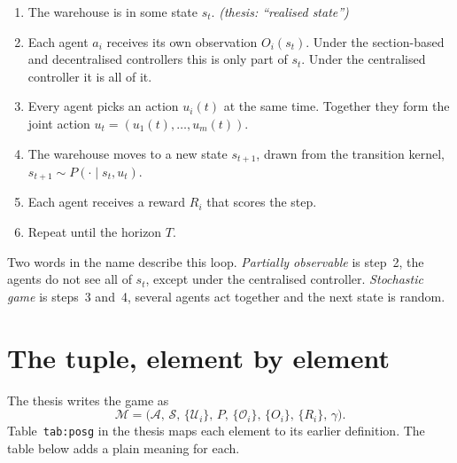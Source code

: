 \documentclass[11pt,a4paper]{article}
\newcommand{\where}[1]{\textit{\small (thesis: #1)}}
\begin{document}
\begin{enumerate}[label=\arabic*.,leftmargin=*]
  \item The warehouse is in some state $s_t$. \where{``realised state''}
  \item Each agent $a_i$ receives its own observation $O_i(s_t)$. Under
        the section-based and decentralised controllers this is only part
        of $s_t$. Under the centralised controller it is all of it.
  \item Every agent picks an action $u_i(t)$ at the same time. Together
        they form the joint action $u_t = (u_1(t),\dots,u_m(t))$.
  \item The warehouse moves to a new state $s_{t+1}$, drawn from the
        transition kernel, $s_{t+1} \sim P(\cdot \mid s_t, u_t)$.
  \item Each agent receives a reward $R_i$ that scores the step.
  \item Repeat until the horizon $T$.
\end{enumerate}

\noindent Two words in the name describe this loop.
\emph{Partially observable} is step~2, the agents do not see all of $s_t$,
except under the centralised controller. \emph{Stochastic game} is
steps~3 and~4, several agents act together and the next state is random.

\section{The tuple, element by element}
\label{sec:guide-tuple}

The thesis writes the game as
\[
  \mathcal{M} = \bigl( \mathcal{A},\, \mathcal{S},\, \{\mathcal{U}_i\},\,
                       P,\, \{\mathcal{O}_i\},\, \{O_i\},\,
                       \{R_i\},\, \gamma \bigr).
\]
Table~\texttt{tab:posg} in the thesis maps each element to its earlier
definition. The table below adds a plain meaning for each.
\end{document}
